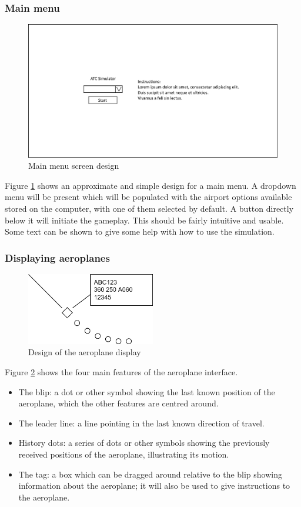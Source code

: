 \documentclass{article}
\begin{document}
\subsubsection{Main menu}
\begin{figure}[H]
\centering
\includegraphics[width=\textwidth]{diagrams/mainmenu.png}
\caption{\label{fig:main_menu_design}Main menu screen design}
\end{figure}
Figure \ref{fig:main_menu_design} shows an approximate and simple design for a main menu.
A dropdown menu will be present which will be populated with the airport options available stored on the computer, with one of them selected by default.
A button directly below it will initiate the gameplay.
This should be fairly intuitive and usable.
Some text can be shown to give some help with how to use the simulation.

\subsubsection{Displaying aeroplanes}
\begin{figure}[H]
\centering
\includegraphics[width=0.5\textwidth]{diagrams/aeroplane_design.png}
\caption{\label{fig:aeroplane_design}Design of the aeroplane display}
\end{figure}
Figure \ref{fig:aeroplane_design} shows the four main features of the aeroplane interface.
\begin{itemize}
    \item The blip: a dot or other symbol showing the last known position of the aeroplane, which the other features are centred around.
    \item The leader line: a line pointing in the last known direction of travel.
    \item History dots: a series of dots or other symbols showing the previously received positions of the aeroplane, illustrating its motion.
    \item The tag: a box which can be dragged around relative to the blip showing information about the aeroplane; it will also be used to give instructions to the aeroplane.
\end{itemize}
\end{document}
